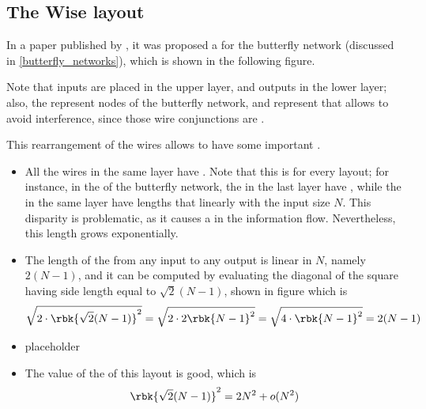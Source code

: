 \documentclass[a4paper, 12pt]{report}
\begin{document}
    \subsection{The Wise layout} \label{wise}

    In a paper published by \textcite{butterwise}, it was proposed a  for the butterfly network (discussed in \cref{butterfly_networks}), which is shown in the following figure.


    Note that inputs are placed in the upper layer, and outputs in the lower layer; also, the  represent nodes of the butterfly network, and  represent  that allows to avoid interference, since those wire conjunctions are .


    This rearrangement of the wires allows to have some important .
    
    \begin{itemize}
        \item All the wires in the same layer have . Note that this is  for every layout; for instance, in the  of the butterfly network, the  in the last layer have , while the  in the same layer have lengths that  linearly with the input size $N$. This disparity is problematic, as it causes a  in the information flow. Nevertheless, this length grows exponentially.
        \item The length of the  from any input to any output is linear in $N$, namely $2(N - 1)$, and it can be computed by evaluating the diagonal of the square having side length equal to $\sqrt 2 (N - 1)$, shown in figure 
            which is$$\sqrt{2 \cdot \rbk{\sqrt{2}(N - 1)}^2} = \sqrt{2 \cdot 2 \rbk{N - 1}^2} = \sqrt{4 \cdot \rbk{N - 1}^2} = 2( N - 1)$$
        \item placeholder 
        \item The value of the  of this layout is good, which is $$\rbk{\sqrt 2(N - 1)}^2 = 2N^2 + o(N^2)$$
    \end{itemize}
\end{document}
